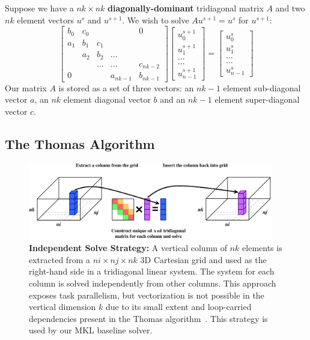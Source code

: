 \documentclass[10pt, conference, compsocconf]{IEEEtran}
\begin{document}
Suppose we have a \(nk \times nk\) \textbf{diagonally-dominant} tridiagonal
  matrix \(A\) and two \(nk\) element vectors \(u^{s}\) and \(u^{s+1}\). 
  We wish to solve \(Au^{s+1} = u^{s}\) for \(u^{s+1}\):
\begin{equation}
\label{eq:tridiag_system}
\begin{bmatrix}
b_0 & c_0 &     &          & 0        \\
a_1 & b_1 & c_1 &          &          \\
    & a_2 & b_2 & ...      &          \\
    &     & ... & ...      & c_{nk-2} \\
0   &     &     & a_{nk-1} & b_{nk-1}
\end{bmatrix}
\begin{bmatrix}
u^{s+1}_0     \\
u^{s+1}_1     \\
...     \\
...     \\
u^{s+1}_{n-1}
\end{bmatrix}
=
\begin{bmatrix}
u^{s}_0     \\
u^{s}_1     \\
...     \\
...     \\
u^{s}_{n-1}
\end{bmatrix}
\end{equation}
Our matrix \(A\) is stored as a set of three vectors: an \(nk-1\) element
  sub-diagonal vector \(a\), an \(nk\) element diagonal vector \(b\) and an
  \(nk-1\) element super-diagonal vector \(c\).

\subsection{The Thomas Algorithm}
\label{sec:impl:thomas_algorithm}

\begin{figure}[!bth]
  \centering
  \caption{\small
      \textbf{Independent Solve Strategy:} A vertical column of \(nk\) elements is
      extracted from a \(ni \times nj \times nk\) 3D Cartesian grid and used as
      the right-hand side in a tridiagonal linear system.
    The system for each column is solved independently from other columns.
    This approach exposes task parallelism, but vectorization is not possible
      in the vertical dimension \(k\) due to its small extent and loop-carried
      dependencies present in the Thomas
      algorithm~\cite{pipelined_thomas_algorithm}.
    This strategy is used by our MKL baseline solver.
  }
  \label{fig:impl:batching:ind_strat}
  \includegraphics[width=0.95\textwidth]{figures/batching/independent_solve_diagram.pdf}
\end{figure}
\end{document}
